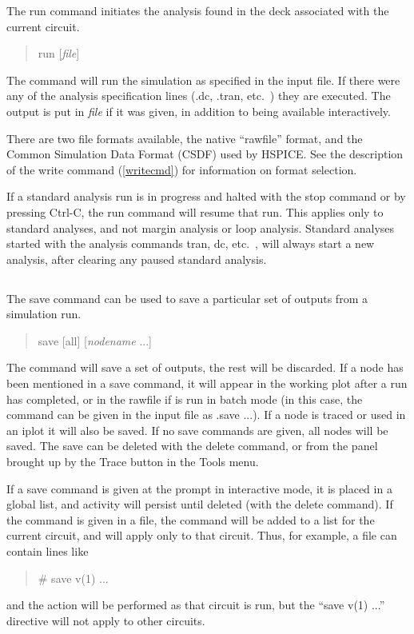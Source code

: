
The {\cb run} command initiates the analysis found in the deck associated
with the current circuit.
\begin{quote}\vt
run [{\it file\/}]
\end{quote}
The command will run the simulation as specified in the input file. 
If there were any of the analysis specification lines ({\vt .dc}, {\vt
.tran}, etc.~) they are executed.  The output is put in {\it
file\/} if it was given, in addition to being available
interactively.

There are two file formats available, the native ``rawfile'' format,
and the Common Simulation Data Format (CSDF) used by HSPICE.  See the
description of the {\cb write} command (\ref{writecmd}) for
information on format selection.

If a standard analysis run is in progress and halted with the {\cb
stop} command or by pressing {\kb Ctrl-C}, the {\cb run} command will
resume that run.  This applies only to standard analyses, and not
margin analysis or loop analysis.  Standard analyses started with the
analysis commands {\cb tran}, {\cb dc}, etc.~, will always start a new
analysis, after clearing any paused standard analysis.

\subsection{}


The {\cb save} command can be used to save a particular set of outputs
from a simulation run.
\begin{quote}\vt
save [all] [{\it nodename\/} ...]
\end{quote}
The command will save a set of outputs, the rest will be discarded. 
If a node has been mentioned in a {\cb save} command, it will appear
in the working plot after a run has completed, or in the rawfile if
{\WRspice} is run in batch mode (in this case, the command can be
given in the input file as {\vt .save} ...).  If a node is traced or
used in an {\cb iplot} it will also be saved.  If no save commands are
given, all nodes will be saved.  The {\cb save} can be deleted with
the {\cb delete} command, or from the panel brought up by the {\cb
Trace} button in the {\cb Tools} menu.

If a {\cb save} command is given at the prompt in interactive mode, it
is placed in a global list, and activity will persist until deleted
(with the {\cb delete} command).  If the command is given in a file,
the command will be added to a list for the current circuit, and will
apply only to that circuit.  Thus, for example, a {\WRspice} file can
contain lines like
\begin{quote}
{\vt *\# save v(1) ...}
\end{quote}
and the action will be performed as that circuit is run, but the
``{\vt save v(1)} ...'' directive will not apply to other circuits.

